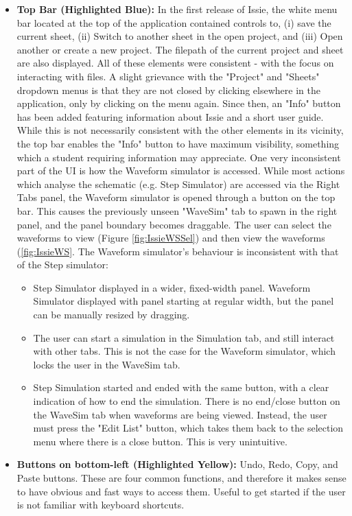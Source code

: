 \begin{itemize}
    \item[] \textbf{Top Bar (Highlighted Blue):} In the first release of Issie, the white menu bar located at the top of the application contained controls to, (i) save the current sheet, (ii) Switch to another sheet in the open project, and (iii) Open another or create a new project. The filepath of the current project and sheet are also displayed. All of these elements were consistent - with the focus on interacting with files. A slight grievance with the "Project" and "Sheets" dropdown menus is that they are not closed by clicking elsewhere in the application, only by clicking on the menu again. Since then, an "Info" button has been added featuring information about Issie and a short user guide. While this is not necessarily consistent with the other elements in its vicinity, the top bar enables the "Info" button to have maximum visibility, something which a student requiring information may appreciate. One very inconsistent part of the UI is how the Waveform simulator is accessed. While most actions which analyse the schematic (e.g. Step Simulator) are accessed via the Right Tabs panel, the Waveform simulator is opened through a button on the top bar. This causes the previously unseen "WaveSim" tab to spawn in the right panel, and the panel boundary becomes draggable. The user can select the waveforms to view (Figure \ref{fig:IssieWSSel}) and then view the waveforms (\ref{fig:IssieWS}. The Waveform simulator's behaviour is inconsistent with that of the Step simulator:
    \begin{itemize}
        \item Step Simulator displayed in a wider, fixed-width panel. Waveform Simulator displayed with panel starting at regular width, but the panel can be manually resized by dragging.
        \item The user can start a simulation in the Simulation tab, and still interact with other tabs. This is not the case for the Waveform simulator, which locks the user in the WaveSim tab.
        \item Step Simulation started and ended with the same button, with a clear indication of how to end the simulation. There is no end/close button on the WaveSim tab when waveforms are being viewed. Instead, the user must press the "Edit List" button, which takes them back to the selection menu where there is a close button. This is very unintuitive.
    \end{itemize}
    \item[] \textbf{Buttons on bottom-left (Highlighted Yellow):} Undo, Redo, Copy, and Paste buttons. These are four common functions, and therefore it makes sense to have obvious and fast ways to access them. Useful to get started if the user is not familiar with keyboard shortcuts.
\end{itemize}

